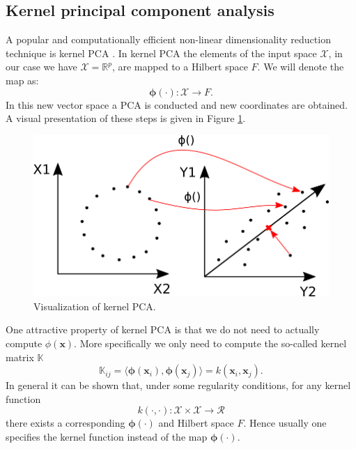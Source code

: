 \subsection{Kernel principal component analysis}
A popular and computationally efficient non-linear dimensionality reduction technique is kernel PCA \parencite{scholkopf_kernel_1997}. In kernel PCA the elements of the input space $\mathcal{X}$, in our case we have $\mathcal{X} = \mathbb{R}^p$, are mapped to a Hilbert space $F$. We will denote the map as: 
\[\bm{\phi}(\cdot): \mathcal{X} \to F.\]
In this new vector space a PCA is conducted and new coordinates are obtained. A visual presentation of these steps is given in Figure \ref{fig:KernelPCA}. \\
\begin{figure}[!htb]
\centering
\includegraphics[scale=0.5]{VectorGraphics/KernelPCA.png}
\caption{\label{fig:KernelPCA}Visualization of kernel PCA.}
\end{figure}

One attractive property of kernel PCA is that we do not need to actually compute $\phi(\bm{x})$. More specifically we only need to compute the so-called kernel matrix $\mathbb{K}$
\[\mathbb{K}_{ij} = \langle \bm{\phi} (\bm{x}_i), \bm{\phi} (\bm{x}_j)  \rangle = k(\bm{x}_i,\bm{x}_j).\]
In general it can be shown that, under some regularity conditions, for any kernel function
\[k(\cdot,\cdot): \mathcal{X} \times \mathcal{X} \to \mathcal{R}\] 
there exists a corresponding $\bm{\phi}(\cdot)$ and Hilbert space $F$. Hence usually one specifies the kernel function instead of the map $\bm{\phi}(\cdot)$.\\ 

